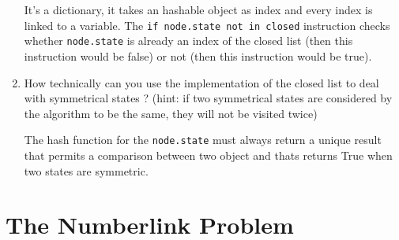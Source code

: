 \begin{enumerate}
\begin{framed}
            It's a dictionary, it takes an hashable object as index and
            every index is linked to a variable. The \verb#if node.state not in closed#
            instruction checks whether \verb#node.state# is already an
            index of the closed list (then this instruction would be
            false) or not (then this instruction would be true).
        \end{framed}
    \item How technically can you use the implementation of the closed
        list to deal with symmetrical states ? (hint: if two symmetrical
        states are considered by the algorithm to be the same, they will
        not be visited twice)
        \begin{framed}
            The hash function for the \verb#node.state# must always return
            a unique result that permits a comparison between two object
            and thats returns True when two states are symmetric.
        \end{framed}
\end{enumerate}

\section{The Numberlink Problem}

